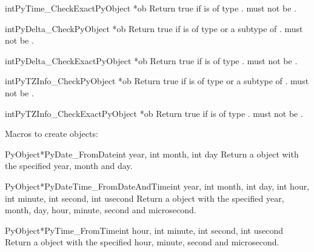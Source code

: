 \begin{cfuncdesc}{int}{PyTime_CheckExact}{PyObject *ob}
  Return true if  is of type .
   must not be \NULL{}.
\end{cfuncdesc}

\begin{cfuncdesc}{int}{PyDelta_Check}{PyObject *ob}
  Return true if  is of type  or
  a subtype of .   must not be
  \NULL{}.
\end{cfuncdesc}

\begin{cfuncdesc}{int}{PyDelta_CheckExact}{PyObject *ob}
  Return true if  is of type .
   must not be \NULL{}.
\end{cfuncdesc}

\begin{cfuncdesc}{int}{PyTZInfo_Check}{PyObject *ob}
  Return true if  is of type  or
  a subtype of .   must not be
  \NULL{}.
\end{cfuncdesc}

\begin{cfuncdesc}{int}{PyTZInfo_CheckExact}{PyObject *ob}
  Return true if  is of type .
   must not be \NULL{}.
\end{cfuncdesc}

Macros to create objects:

\begin{cfuncdesc}{PyObject*}{PyDate_FromDate}{int year, int month, int day}
  Return a  object with the specified year, month
  and day.
\end{cfuncdesc}

\begin{cfuncdesc}{PyObject*}{PyDateTime_FromDateAndTime}{int year, int month,
        int day, int hour, int minute, int second, int usecond}
  Return a  object with the specified year, month,
  day, hour, minute, second and microsecond.
\end{cfuncdesc}

\begin{cfuncdesc}{PyObject*}{PyTime_FromTime}{int hour, int minute,
        int second, int usecond}
  Return a  object with the specified hour, minute,
  second and microsecond.
\end{cfuncdesc}

